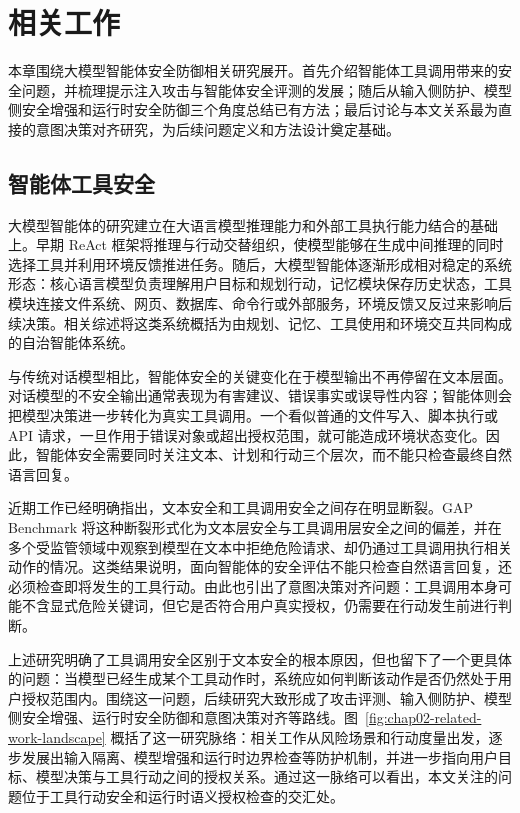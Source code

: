 
\chapter{相关工作}

本章围绕大模型智能体安全防御相关研究展开。首先介绍智能体工具调用带来的安全问题，并梳理提示注入攻击与智能体安全评测的发展；随后从输入侧防护、模型侧安全增强和运行时安全防御三个角度总结已有方法；最后讨论与本文关系最为直接的意图决策对齐研究，为后续问题定义和方法设计奠定基础。

\section{智能体工具安全}

大模型智能体的研究建立在大语言模型推理能力和外部工具执行能力结合的基础上。早期 ReAct 框架将推理与行动交替组织，使模型能够在生成中间推理的同时选择工具并利用环境反馈推进任务\cite{yao2022react}。随后，大模型智能体逐渐形成相对稳定的系统形态：核心语言模型负责理解用户目标和规划行动，记忆模块保存历史状态，工具模块连接文件系统、网页、数据库、命令行或外部服务，环境反馈又反过来影响后续决策。相关综述将这类系统概括为由规划、记忆、工具使用和环境交互共同构成的自治智能体系统\cite{wang2024survey}。

与传统对话模型相比，智能体安全的关键变化在于模型输出不再停留在文本层面。对话模型的不安全输出通常表现为有害建议、错误事实或误导性内容；智能体则会把模型决策进一步转化为真实工具调用。一个看似普通的文件写入、脚本执行或 API 请求，一旦作用于错误对象或超出授权范围，就可能造成环境状态变化。因此，智能体安全需要同时关注文本、计划和行动三个层次，而不能只检查最终自然语言回复。

近期工作已经明确指出，文本安全和工具调用安全之间存在明显断裂。GAP Benchmark 将这种断裂形式化为文本层安全与工具调用层安全之间的偏差，并在多个受监管领域中观察到模型在文本中拒绝危险请求、却仍通过工具调用执行相关动作的情况\cite{cartagena2026mind}。这类结果说明，面向智能体的安全评估不能只检查自然语言回复，还必须检查即将发生的工具行动。由此也引出了意图决策对齐问题：工具调用本身可能不含显式危险关键词，但它是否符合用户真实授权，仍需要在行动发生前进行判断。

上述研究明确了工具调用安全区别于文本安全的根本原因，但也留下了一个更具体的问题：当模型已经生成某个工具动作时，系统应如何判断该动作是否仍然处于用户授权范围内。围绕这一问题，后续研究大致形成了攻击评测、输入侧防护、模型侧安全增强、运行时安全防御和意图决策对齐等路线。图~\ref{fig:chap02-related-work-landscape} 概括了这一研究脉络：相关工作从风险场景和行动度量出发，逐步发展出输入隔离、模型增强和运行时边界检查等防护机制，并进一步指向用户目标、模型决策与工具行动之间的授权关系。通过这一脉络可以看出，本文关注的问题位于工具行动安全和运行时语义授权检查的交汇处。


